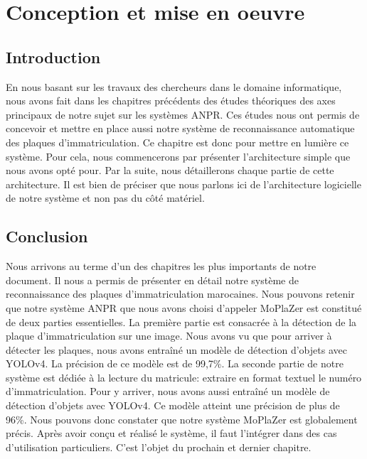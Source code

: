 \chapter{\textbf{Conception et mise en oeuvre}}
    \section{Introduction}
    En nous basant sur les travaux des chercheurs dans le domaine informatique, nous avons fait dans les chapitres précédents des études théoriques des axes principaux de notre sujet sur les systèmes ANPR. Ces études nous ont permis de concevoir et mettre en place aussi notre système de reconnaissance automatique des plaques d'immatriculation. Ce chapitre est donc pour mettre en lumière ce système. Pour cela, nous commencerons par présenter l'architecture simple que nous avons opté pour. Par la suite, nous détaillerons chaque partie de cette architecture. Il est bien de préciser que nous parlons ici de l'architecture logicielle de notre système et non pas du côté matériel.
    
    
    
    

    \section{Conclusion}
    Nous arrivons au terme d’un des chapitres les plus importants de notre document. Il  nous a permis de présenter en détail notre système de reconnaissance des plaques d’immatriculation marocaines. Nous pouvons retenir que notre système ANPR que nous avons choisi d’appeler MoPlaZer est constitué de deux parties essentielles. La première partie est consacrée à la détection de la plaque d’immatriculation sur une image. Nous avons vu que pour arriver à détecter les plaques, nous avons entraîné un modèle de détection d’objets avec YOLOv4. La précision de ce modèle est de 99,7\%. La seconde partie de notre système est dédiée à la lecture du matricule: extraire en format textuel le numéro d’immatriculation. Pour y arriver, nous avons aussi entraîné un modèle de détection d’objets avec YOLOv4. Ce modèle atteint une précision de plus de 96\%. Nous pouvons donc constater que notre système MoPlaZer est globalement précis. Après avoir conçu et réalisé le système, il faut l’intégrer dans des cas d’utilisation particuliers. C’est l’objet du prochain et dernier chapitre.